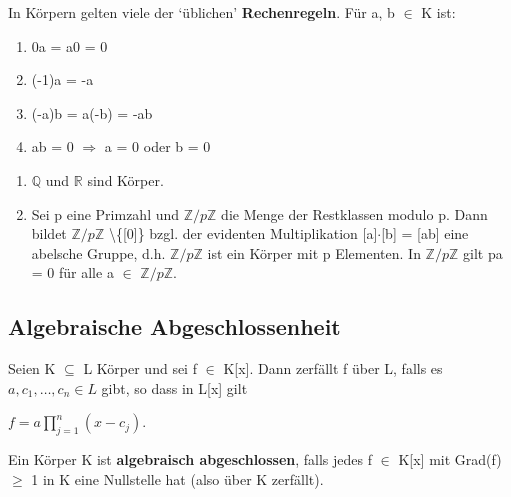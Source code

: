 \begin{remark}
In Körpern gelten viele der ‘üblichen’ \textbf{Rechenregeln}. Für a, b $\in$ K ist:
\begin{enumerate} 
\item 0a = a0 = 0 
\item (-1)a = -a
\item (-a)b = a(-b) = -ab
\item ab = 0 $\Rightarrow$ a = 0 oder b = 0
\end{enumerate}
\end{remark}

\begin{example}
\leavevmode
\begin{enumerate}
\item $\mathbb{Q}$ und $\mathbb{R}$ sind Körper.
\item Sei p eine Primzahl und $\mathbb{Z}/p\mathbb{Z}$ die Menge der Restklassen modulo p. Dann bildet $\mathbb{Z}/p\mathbb{Z}$ \textbackslash\{[0]\} bzgl. der evidenten Multiplikation [a]$\cdot$[b] = [ab] eine abelsche Gruppe, d.h. $\mathbb{Z}/p\mathbb{Z}$ ist ein Körper mit p Elementen. In $\mathbb{Z}/p\mathbb{Z}$ gilt pa = 0 für alle a $\in$ $\mathbb{Z}/p\mathbb{Z}$.
\end{enumerate}
\end{example}

\subsection{Algebraische Abgeschlossenheit}
\begin{definition}
Seien K $\subseteq$ L Körper und sei f $\in$ K[x]. Dann zerfällt f über L, falls es $a, c_1, …, c_n \in L$ gibt, so dass in L[x] gilt
\begin{center}
$f = a \prod\limits_{j=1}^{n}(x - c_j)$.
\end{center}
Ein Körper K ist \textbf{algebraisch abgeschlossen}, falls jedes f $\in$ K[x] mit Grad(f) $\ge$ 1 in K eine Nullstelle hat (also über K zerfällt).
\end{definition}

